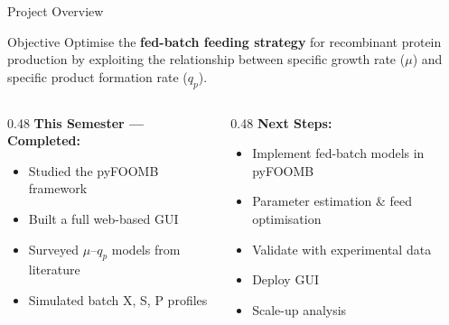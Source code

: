 \documentclass[aspectratio=169, 11pt]{beamer}
\begin{document}
\begin{frame}{Project Overview}
  \begin{block}{Objective}
    Optimise the \textbf{fed-batch feeding strategy} for recombinant protein production
    by exploiting the relationship between specific growth rate ($\mu$) and
    specific product formation rate ($q_p$).
  \end{block}

  \vspace{0.3cm}
  \begin{columns}[T]
    \begin{column}{0.48\textwidth}
      \textbf{This Semester — Completed:}
      \begin{itemize}
        \item[\textcolor{donegreen}{\checkmark}] Studied the pyFOOMB framework
        \item[\textcolor{donegreen}{\checkmark}] Built a full web-based GUI
        \item[\textcolor{donegreen}{\checkmark}] Surveyed $\mu$--$q_p$ models from literature
        \item[\textcolor{donegreen}{\checkmark}] Simulated batch X, S, P profiles
      \end{itemize}
    \end{column}
    \begin{column}{0.48\textwidth}
      \textbf{Next Steps:}
      \begin{itemize}
        \item[\textcolor{pendinggray}{$\circ$}] Implement fed-batch models in pyFOOMB
        \item[\textcolor{pendinggray}{$\circ$}] Parameter estimation \& feed optimisation
        \item[\textcolor{pendinggray}{$\circ$}] Validate with experimental data
        \item[\textcolor{pendinggray}{$\circ$}] Deploy GUI
        \item[\textcolor{pendinggray}{$\circ$}] Scale-up analysis
      \end{itemize}
    \end{column}
  \end{columns}
\end{frame}
\end{document}
